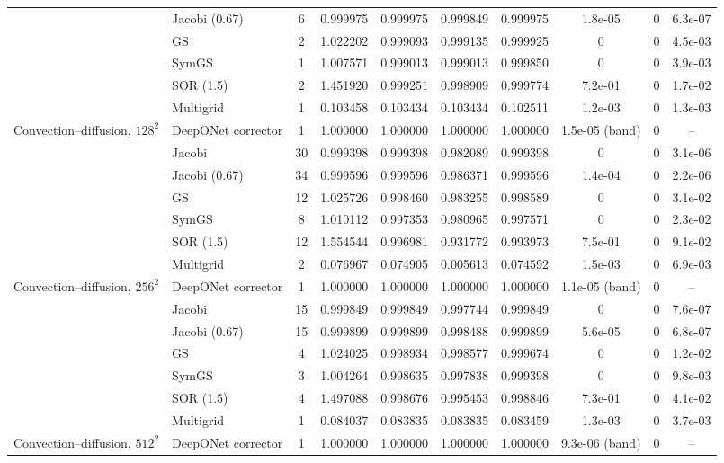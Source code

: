 {\begin{tabular}{llcccccccc}
 & Jacobi (0.67) & 6 & 0.999975 & 0.999975 & 0.999849 & 0.999975 & 1.8e-05 & 0 & 6.3e-07 \\
 & GS & 2 & 1.022202 & 0.999093 & 0.999135 & 0.999925 & 0 & 0 & 4.5e-03 \\
 & SymGS & 1 & 1.007571 & 0.999013 & 0.999013 & 0.999850 & 0 & 0 & 3.9e-03 \\
 & SOR (1.5) & 2 & 1.451920 & 0.999251 & 0.998909 & 0.999774 & 7.2e-01 & 0 & 1.7e-02 \\
 & Multigrid & 1 & 0.103458 & 0.103434 & 0.103434 & 0.102511 & 1.2e-03 & 0 & 1.3e-03 \\
\midrule
Convection--diffusion, $128^2$ & DeepONet corrector & 1 & 1.000000 & 1.000000 & 1.000000 & 1.000000 & 1.5e-05 (band) & 0 & -- \\
 & Jacobi & 30 & 0.999398 & 0.999398 & 0.982089 & 0.999398 & 0 & 0 & 3.1e-06 \\
 & Jacobi (0.67) & 34 & 0.999596 & 0.999596 & 0.986371 & 0.999596 & 1.4e-04 & 0 & 2.2e-06 \\
 & GS & 12 & 1.025726 & 0.998460 & 0.983255 & 0.998589 & 0 & 0 & 3.1e-02 \\
 & SymGS & 8 & 1.010112 & 0.997353 & 0.980965 & 0.997571 & 0 & 0 & 2.3e-02 \\
 & SOR (1.5) & 12 & 1.554544 & 0.996981 & 0.931772 & 0.993973 & 7.5e-01 & 0 & 9.1e-02 \\
 & Multigrid & 2 & 0.076967 & 0.074905 & 0.005613 & 0.074592 & 1.5e-03 & 0 & 6.9e-03 \\
\midrule
Convection--diffusion, $256^2$ & DeepONet corrector & 1 & 1.000000 & 1.000000 & 1.000000 & 1.000000 & 1.1e-05 (band) & 0 & -- \\
 & Jacobi & 15 & 0.999849 & 0.999849 & 0.997744 & 0.999849 & 0 & 0 & 7.6e-07 \\
 & Jacobi (0.67) & 15 & 0.999899 & 0.999899 & 0.998488 & 0.999899 & 5.6e-05 & 0 & 6.8e-07 \\
 & GS & 4 & 1.024025 & 0.998934 & 0.998577 & 0.999674 & 0 & 0 & 1.2e-02 \\
 & SymGS & 3 & 1.004264 & 0.998635 & 0.997838 & 0.999398 & 0 & 0 & 9.8e-03 \\
 & SOR (1.5) & 4 & 1.497088 & 0.998676 & 0.995453 & 0.998846 & 7.3e-01 & 0 & 4.1e-02 \\
 & Multigrid & 1 & 0.084037 & 0.083835 & 0.083835 & 0.083459 & 1.3e-03 & 0 & 3.7e-03 \\
\midrule
Convection--diffusion, $512^2$ & DeepONet corrector & 1 & 1.000000 & 1.000000 & 1.000000 & 1.000000 & 9.3e-06 (band) & 0 & -- \\

\end{tabular}}
